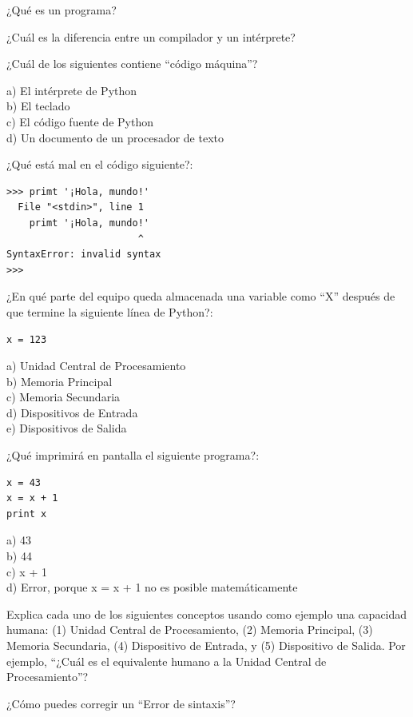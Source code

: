 \begin{ex}
¿Qué es un programa?
\end{ex}

\begin{ex}
¿Cuál es la diferencia entre un compilador y un intérprete?
\end{ex}

\begin{ex}
¿Cuál de los siguientes contiene ``código máquina''?

a) El intérprete de Python\\
b) El teclado\\
c) El código fuente de Python\\
d) Un documento de un procesador de texto
\end{ex}

\begin{ex}
¿Qué está mal en el código siguiente?:

\beforeverb
\begin{verbatim}
>>> primt '¡Hola, mundo!'
  File "<stdin>", line 1
    primt '¡Hola, mundo!'
                       ^
SyntaxError: invalid syntax
>>> 
\end{verbatim}
\afterverb

\end{ex}

\begin{ex}
¿En qué parte del equipo queda almacenada una variable como ``X''
después de que termine la siguiente línea de Python?:

\beforeverb
\begin{verbatim}
x = 123
\end{verbatim}
\afterverb
%
a) Unidad Central de Procesamiento\\
b) Memoria Principal\\
c) Memoria Secundaria\\
d) Dispositivos de Entrada\\
e) Dispositivos de Salida
\end{ex}

\begin{ex}
¿Qué imprimirá en pantalla el siguiente programa?:

\beforeverb
\begin{verbatim}
x = 43
x = x + 1
print x
\end{verbatim}
\afterverb
%
a) 43\\
b) 44\\
c) x + 1\\
d) Error, porque x = x + 1 no es posible matemáticamente
\end{ex}

\begin{ex}
Explica cada uno de los siguientes conceptos usando como ejemplo una capacidad humana:
(1) Unidad Central de Procesamiento, (2) Memoria Principal, (3) Memoria Secundaria, 
(4) Dispositivo de Entrada, y
(5) Dispositivo de Salida.
Por ejemplo, ``¿Cuál es el equivalente humano a la Unidad Central de Procesamiento''? 
\end{ex}

\begin{ex}
¿Cómo puedes corregir un ``Error de sintaxis''?
\end{ex}